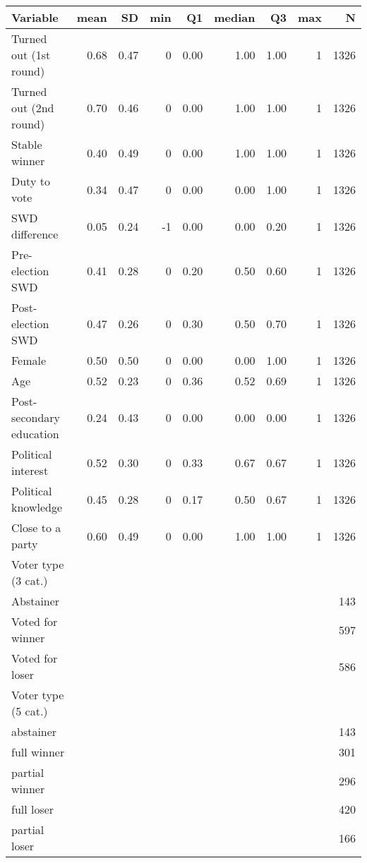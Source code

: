 
\begin{tabular}{l|r|r|r|r|r|r|r|r}
\hline
Variable & mean & SD & min & Q1 & median & Q3 & max & N\\
\hline
Turned out (1st round) & 0.68 & 0.47 & 0 & 0.00 & 1.00 & 1.00 & 1 & 1326\\
\hline
Turned out (2nd round) & 0.70 & 0.46 & 0 & 0.00 & 1.00 & 1.00 & 1 & 1326\\
\hline
Stable winner & 0.40 & 0.49 & 0 & 0.00 & 1.00 & 1.00 & 1 & 1326\\
\hline
Duty to vote & 0.34 & 0.47 & 0 & 0.00 & 0.00 & 1.00 & 1 & 1326\\
\hline
SWD difference & 0.05 & 0.24 & -1 & 0.00 & 0.00 & 0.20 & 1 & 1326\\
\hline
Pre-election SWD & 0.41 & 0.28 & 0 & 0.20 & 0.50 & 0.60 & 1 & 1326\\
\hline
Post-election SWD & 0.47 & 0.26 & 0 & 0.30 & 0.50 & 0.70 & 1 & 1326\\
\hline
Female & 0.50 & 0.50 & 0 & 0.00 & 0.00 & 1.00 & 1 & 1326\\
\hline
Age & 0.52 & 0.23 & 0 & 0.36 & 0.52 & 0.69 & 1 & 1326\\
\hline
Post-secondary education & 0.24 & 0.43 & 0 & 0.00 & 0.00 & 0.00 & 1 & 1326\\
\hline
Political interest & 0.52 & 0.30 & 0 & 0.33 & 0.67 & 0.67 & 1 & 1326\\
\hline
Political knowledge & 0.45 & 0.28 & 0 & 0.17 & 0.50 & 0.67 & 1 & 1326\\
\hline
Close to a party & 0.60 & 0.49 & 0 & 0.00 & 1.00 & 1.00 & 1 & 1326\\
\hline
Voter type (3 cat.) &  &  &  &  &  &  &  & \\
\hline
\quad Abstainer &  &  &  &  &  &  &  & 143\\
\hline
\quad Voted for winner &  &  &  &  &  &  &  & 597\\
\hline
\quad Voted for loser &  &  &  &  &  &  &  & 586\\
\hline
Voter type (5 cat.) &  &  &  &  &  &  &  & \\
\hline
\quad abstainer &  &  &  &  &  &  &  & 143\\
\hline
\quad full winner &  &  &  &  &  &  &  & 301\\
\hline
\quad partial winner &  &  &  &  &  &  &  & 296\\
\hline
\quad full loser &  &  &  &  &  &  &  & 420\\
\hline
\quad partial loser &  &  &  &  &  &  &  & 166\\
\hline
\end{tabular}

